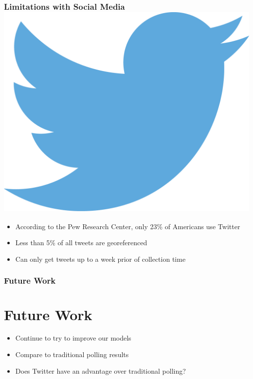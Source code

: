 \documentclass[xcolor=dvipsnames]{beamer}
\begin{document}
\begin{frame}
\frametitle{Limitations with Social Media \hfill \hfill \includegraphics[scale=.1]{twitterlogo.png}}
\begin{itemize}

	\item According to the Pew Research Center, only 23\% of Americans use Twitter \pause  
	\item Less than 5\% of all tweets are georeferenced \pause 
	\item Can only get tweets up to a week prior of collection time \pause 

	
\end{itemize}

\end{frame}

\begin{frame}
\frametitle{Future Work}
\section{Future Work}
\begin{itemize}
\item Continue to try to improve our models 
\item Compare to traditional polling results
\item Does Twitter have an advantage over traditional polling?
\end{itemize}
\end{frame}
\end{document}
